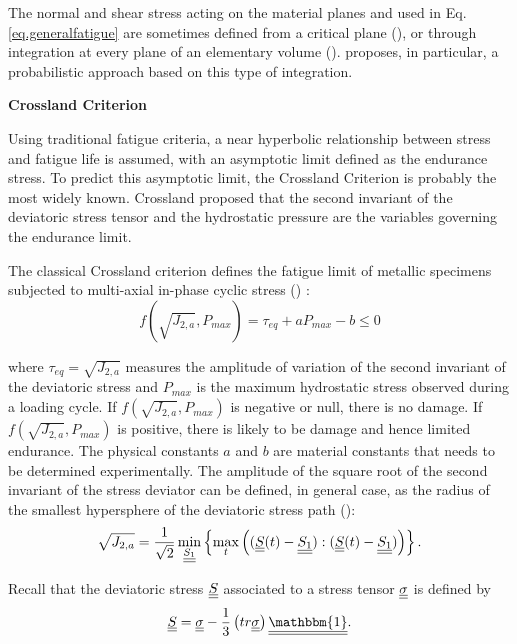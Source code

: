 The normal and shear stress acting on the material planes and used in Eq.\eqref{eq.generalfatigue} are sometimes defined from a critical plane (\cite{findley1959behavior}), or
through integration at every plane of an elementary volume (\cite{liu1993berechnung}). \cite{thu2008effet} proposes, in
particular, a probabilistic approach based on this type of integration.

\vspace{6pt}
\textbf{Crossland Criterion}
\vspace{6pt}

 Using traditional fatigue criteria, a near hyperbolic relationship between stress and fatigue life is assumed, with an asymptotic limit defined as the endurance stress. To predict this asymptotic limit, the Crossland Criterion is probably the most widely known. Crossland proposed that the second invariant of the deviatoric stress tensor and the hydrostatic pressure are the variables governing the endurance limit. 

The classical Crossland criterion defines the fatigue limit of metallic specimens subjected to multi-axial in-phase cyclic stress (\cite{crossland1956effect}) : 
\begin{equation}f(\sqrt{J_{2,a}},P_{max})=\tau_{eq}+aP_{max}-b\leqslant 0\end{equation}

where $\tau_{eq}=\sqrt{J_{2,a}}$ measures  the amplitude of variation of the second invariant of the deviatoric stress  and $P_{max}$ is the maximum hydrostatic stress observed during a loading cycle. If $f(\sqrt{J_{2,a}},P_{max})$ is negative or null, there is no damage. If $f(\sqrt{J_{2,a}},P_{max})$ is positive, there is likely to be damage and hence limited endurance. The physical constants $a$ and $b$ are material constants that needs to be determined experimentally. The amplitude of the square root of the second invariant of the stress deviator can be defined, in general case, as the radius of the smallest hypersphere of the deviatoric stress path (\cite{Papadopoulos1997219}):
\begin{equation}\sqrt{J_{2,a}}=\frac{1}{\sqrt{2}}\min \limits_{\uline{\uline{S_1}}}\left\lbrace \max \limits_{t}\left( (\uline{\uline{S}}(t)-\uline{\uline{S_1}}):(\uline{\uline{S}}(t)-\uline{\uline{S_1}})\right)\right\rbrace .\end{equation}

Recall that the deviatoric stress $\uline{\uline{S}}$ associated to a stress tensor $\uline{\uline{\sigma}}$  is defined by
\begin{equation} \uline{\uline{S}}=\uline{\uline{\sigma}}-\frac{1}{3}\left( tr\uline{\uline{\sigma}}\right) \uline{\uline{\mathbbm{1}}}.
\end{equation}

